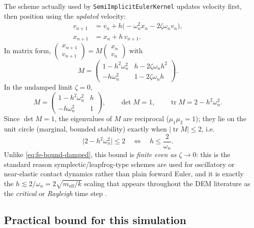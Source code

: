 \documentclass[11pt]{article}
\begin{document}
The scheme actually used by \texttt{SemiImplicitEulerKernel} updates velocity first, then
position using the \emph{updated} velocity:
\begin{align}
  v_{n+1} &= v_n + h\big(-\omega_n^2 x_n - 2\zeta\omega_n v_n\big), \\
  x_{n+1} &= x_n + h\, v_{n+1}.
\end{align}
In matrix form, $\begin{pmatrix} x_{n+1} \\ v_{n+1} \end{pmatrix} = M \begin{pmatrix} x_n \\ v_n \end{pmatrix}$ with
\begin{equation}
  M = \begin{pmatrix} 1 - h^2\omega_n^2 & h - 2\zeta\omega_n h^2 \\ -h\omega_n^2 & 1 - 2\zeta\omega_n h \end{pmatrix}.
\end{equation}
In the undamped limit $\zeta = 0$,
\begin{equation}
  M = \begin{pmatrix} 1 - h^2\omega_n^2 & h \\ -h\omega_n^2 & 1 \end{pmatrix},
  \qquad \det M = 1, \qquad \operatorname{tr} M = 2 - h^2\omega_n^2.
\end{equation}
Since $\det M = 1$, the eigenvalues of $M$ are reciprocal ($\mu_1\mu_2 = 1$); they lie on
the unit circle (marginal, bounded stability) exactly when $|\operatorname{tr} M| \le 2$,
i.e.
\begin{equation}
  \Big| 2 - h^2\omega_n^2 \Big| \le 2 \quad\Longleftrightarrow\quad h \le \frac{2}{\omega_n}.
  \label{eq:si-bound}
\end{equation}
Unlike \eqref{eq:fe-bound-damped}, this bound is \emph{finite even as $\zeta \to 0$}: this
is the standard reason symplectic/leapfrog-type schemes are used for oscillatory or
near-elastic contact dynamics rather than plain forward Euler, and it is exactly the
$h \lesssim 2/\omega_n = 2\sqrt{m_{\text{eff}}/k}$ scaling that appears throughout the DEM
literature as the \emph{critical} or \emph{Rayleigh} time step
\cite{cundallstrack1979,osullivanbray2004}.

\subsection{Practical bound for this simulation}
\end{document}
